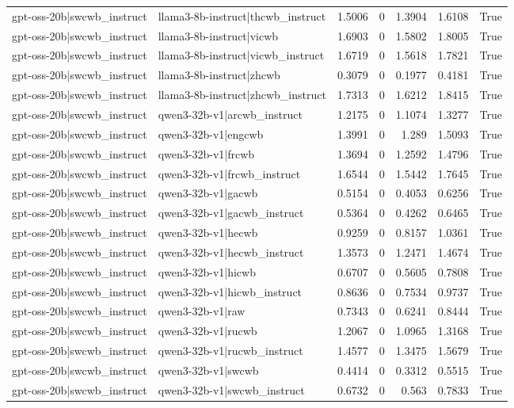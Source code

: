 \begin{table}
\begin{tabular}{l l r r r r l}
gpt-oss-20b|swcwb_instruct & llama3-8b-instruct|thcwb_instruct & 1.5006 & 0 & 1.3904 & 1.6108 & True \\
gpt-oss-20b|swcwb_instruct & llama3-8b-instruct|vicwb & 1.6903 & 0 & 1.5802 & 1.8005 & True \\
gpt-oss-20b|swcwb_instruct & llama3-8b-instruct|vicwb_instruct & 1.6719 & 0 & 1.5618 & 1.7821 & True \\
gpt-oss-20b|swcwb_instruct & llama3-8b-instruct|zhcwb & 0.3079 & 0 & 0.1977 & 0.4181 & True \\
gpt-oss-20b|swcwb_instruct & llama3-8b-instruct|zhcwb_instruct & 1.7313 & 0 & 1.6212 & 1.8415 & True \\
gpt-oss-20b|swcwb_instruct & qwen3-32b-v1|arcwb_instruct & 1.2175 & 0 & 1.1074 & 1.3277 & True \\
gpt-oss-20b|swcwb_instruct & qwen3-32b-v1|engcwb & 1.3991 & 0 & 1.289 & 1.5093 & True \\
gpt-oss-20b|swcwb_instruct & qwen3-32b-v1|frcwb & 1.3694 & 0 & 1.2592 & 1.4796 & True \\
gpt-oss-20b|swcwb_instruct & qwen3-32b-v1|frcwb_instruct & 1.6544 & 0 & 1.5442 & 1.7645 & True \\
gpt-oss-20b|swcwb_instruct & qwen3-32b-v1|gacwb & 0.5154 & 0 & 0.4053 & 0.6256 & True \\
gpt-oss-20b|swcwb_instruct & qwen3-32b-v1|gacwb_instruct & 0.5364 & 0 & 0.4262 & 0.6465 & True \\
gpt-oss-20b|swcwb_instruct & qwen3-32b-v1|hecwb & 0.9259 & 0 & 0.8157 & 1.0361 & True \\
gpt-oss-20b|swcwb_instruct & qwen3-32b-v1|hecwb_instruct & 1.3573 & 0 & 1.2471 & 1.4674 & True \\
gpt-oss-20b|swcwb_instruct & qwen3-32b-v1|hicwb & 0.6707 & 0 & 0.5605 & 0.7808 & True \\
gpt-oss-20b|swcwb_instruct & qwen3-32b-v1|hicwb_instruct & 0.8636 & 0 & 0.7534 & 0.9737 & True \\
gpt-oss-20b|swcwb_instruct & qwen3-32b-v1|raw & 0.7343 & 0 & 0.6241 & 0.8444 & True \\
gpt-oss-20b|swcwb_instruct & qwen3-32b-v1|rucwb & 1.2067 & 0 & 1.0965 & 1.3168 & True \\
gpt-oss-20b|swcwb_instruct & qwen3-32b-v1|rucwb_instruct & 1.4577 & 0 & 1.3475 & 1.5679 & True \\
gpt-oss-20b|swcwb_instruct & qwen3-32b-v1|swcwb & 0.4414 & 0 & 0.3312 & 0.5515 & True \\
gpt-oss-20b|swcwb_instruct & qwen3-32b-v1|swcwb_instruct & 0.6732 & 0 & 0.563 & 0.7833 & True \\

\end{tabular}
\end{table}
